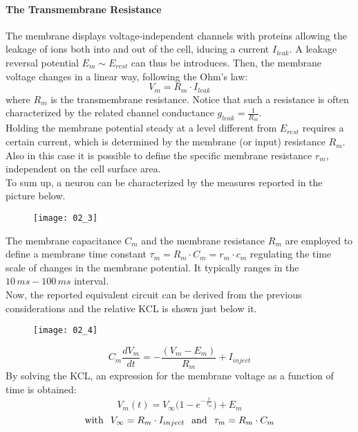 \paragraph{The Transmembrane Resistance}
The membrane displays voltage-independent channels with proteins allowing the leakage of ions
both into and out of the cell, iducing a current \(I_{leak}\). A leakage reversal potential
\(E_{m}\sim{E_{rest}}\) can thus be introduces. Then, the membrane voltage changes in a linear way,
following the Ohm's law:
\begin{equation*}
    V_{m}=R_{m}\cdot{I_{leak}}
\end{equation*}
where \(R_{m}\) is the transmembrane resistance. Notice that such a resistance is often
characterized by the related channel conductance \(g_{leak}=\frac{1}{R_{m}}\).\\
Holding the membrane potential steady at a level different from \(E_{rest}\) requires a certain
current, which is determined by the membrane (or input) resistance \(R_{m}\). Also in this
case it is possible to define the specific membrane resistance \(r_{m}\), independent on the
cell surface area.\\
\newline
To sum up, a neuron can be characterized by the measures reported in the picture below.
\begin{figure}[H]
    \texttt{[image: 02\_3]}
    \centering
\end{figure}
The membrane capacitance \(C_{m}\) and the membrane resistance \(R_{m}\) are employed to define
a membrane time constant \(\tau_{m}=R_{m}\cdot{C_{m}}=r_{m}\cdot{c_{m}}\) regulating the time
scale of changes in the membrane potential. It typically ranges in the \(10\,ms-100\,ms\) interval.\\
Now, the reported equivalent circuit can be derived from the previous considerations and the
relative KCL is shown just below it.
\begin{figure}[H]
    \texttt{[image: 02\_4]}
    \centering
\end{figure}
\begin{equation*}
    C_{m}\frac{dV_{m}}{dt}=-\frac{(V_{m}-E_{m})}{R_{m}}+I_{inject}
\end{equation*}
By solving the KCL, an expression for the membrane voltage as a function of time is obtained:
\begin{equation*}
    V_{m}(t)=V_{\infty}\bigl(1-e^{-\frac{t}{\tau_{m}}}\bigr)+E_{m}
\end{equation*}
\begin{equation*}
    \text{with}
    \hspace{0.25cm}
    V_{\infty}=R_{m}\cdot{I_{inject}}
    \hspace{0.25cm}
    \text{and}
    \hspace{0.25cm}
    \tau_{m}=R_{m}\cdot{C_{m}}
\end{equation*}
